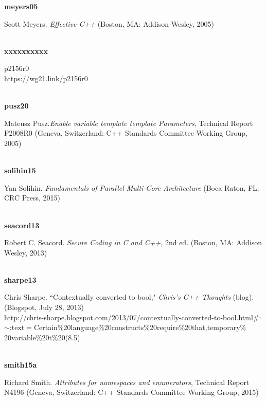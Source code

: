 \noindent\textbf{meyers05}\\
\hspace*{2em}\parbox[t]{\textwidth}{Scott Meyers. \textit{Effective C++} (Boston, MA: Addison-Wesley, 2005)}\\

\noindent\textbf{xxxxxxxxxx}\\
\hspace*{2em}\parbox[t]{\textwidth}{\textit{}p2156r0\\
https://wg21.link/p2156r0}\\

\noindent\textbf{pusz20}\\
\hspace*{2em}\parbox[t]{\textwidth}{Mateusz Pusz.\textit{Enable variable template template Parameters}, Technical Report P2008R0 (Geneva, Switzerland: C++ Standards Committee Working Group, 2005)}\\

\noindent\textbf{solihin15}\\
\hspace*{2em}\parbox[t]{\textwidth}{Yan Solihin. \textit{Fundamentals of Parallel Multi-Core Architecture} (Boca Raton, FL: CRC Press, 2015)}\\

\noindent\textbf{seacord13}\\
\hspace*{2em}\parbox[t]{\textwidth}{Robert C. Seacord. \textit{Secure Coding in C and C++}, 2nd ed. (Boston, MA: Addison Wesley, 2013)}\\

\noindent\textbf{sharpe13}\\
\hspace*{2em}\parbox[t]{\textwidth}{Chris Sharpe. ``Contextually converted to bool," \textit{Chris's C++ Thoughts} (blog). (Blogspot, July 28, 2013)\\
http://chris-sharpe.blogspot.com/2013/07/contextually-converted-to-bool.html\#:{$\sim$}:\linebreak[4]text$=$Certain$\%$20language$\%$20constructs$\%$20require$\%$20that,temporary$\%$20variable\linebreak[4]$\%$20t$\%$20(8.5)}\\

\noindent\textbf{smith15a}\\
\hspace*{2em}\parbox[t]{\textwidth}{Richard Smith. \textit{Attributes for namespaces and enumerators},  Technical Report N4196 (Geneva, Switzerland: C++ Standards Committee Working Group, 2015)}\\

